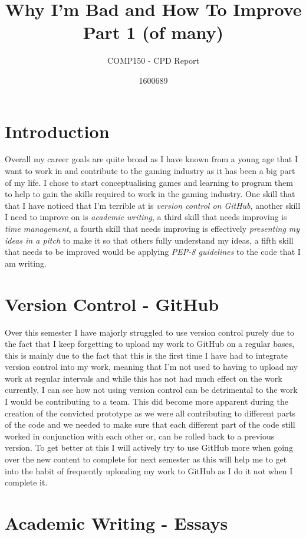 \documentclass{scrartcl}
\title{Why I'm Bad and How To Improve\\ Part 1 (of many)}
\subtitle{COMP150 - CPD Report}
\author{1600689}
\begin{document}
\maketitle

\section{Introduction}

Overall my career goals are quite broad as I have known from a young age that I want to work in and contribute to the gaming industry as it has been a big part of my life. I chose to start conceptualising games and learning to program them to help to gain the skills required to work in the gaming industry. One skill that that I have noticed that I’m terrible at is \textit{version control on GitHub}, another skill I need to improve on is \textit{academic writing}, a third skill that needs improving is \textit{time management}, a fourth skill that needs improving is effectively \textit{presenting my ideas in a pitch} to make it so that others fully understand my ideas, a fifth skill that needs to be improved would be applying \textit{PEP-8 guidelines} to the code that I am writing.

\section{Version Control - GitHub}

Over this semester I have majorly struggled to use version control purely due to the fact that I keep forgetting to upload my work to GitHub on a regular bases, this is mainly due to the fact that this is the first time I have had to integrate version control into my work, meaning that I’m not used to having to upload my work at regular intervals and while this has not had much effect on the work currently, I can see how not using version control can be detrimental to the work I would be contributing to a team. This did become more apparent during the creation of the convicted prototype as we were all contributing to different parts of the code and we needed to make sure that each different part of the code still worked in conjunction with each other or, can be rolled back to a previous version. To get better at this I will actively try to use GitHub more when going over the new content to complete for next semester as this will help me to get into the habit of frequently uploading my work to GitHub as I do it not when I complete it.

\section{Academic Writing - Essays}
\end{document}
